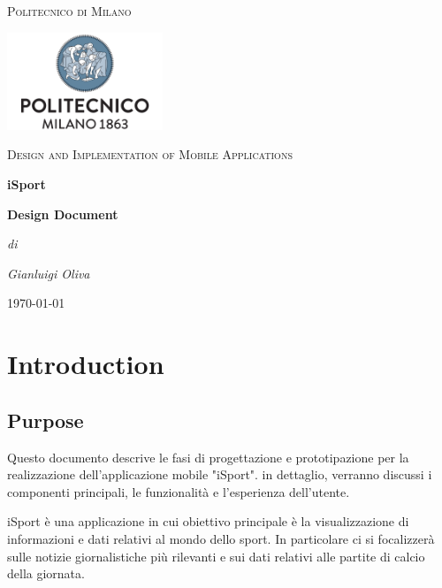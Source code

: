 \documentclass[numbers=noenddot, 12pt, a4paper, oneside]{scrbook}
\begin{document}
\begin{titlepage}
	\centering
	{\scshape\LARGE Politecnico di Milano \par}
	\vspace{1cm}
	\includegraphics[width=0.35\textwidth]{polimi-logo}\par
	\vspace{1cm}

	{\scshape\Large Design and Implementation of Mobile Applications\par}
	\vspace{1.5cm}
	{\huge\bfseries iSport \par}
	\vspace{1cm}
	{\Large\bfseries Design Document \par}
	\vspace{3cm}
	{\Large\itshape di\par}
	{\Large\itshape Gianluigi Oliva\par}
	\vspace{1.5cm}
	\vfill
	


	\vfill

	{\large \today\par}
\end{titlepage}

\newpage
\tableofcontents
\newpage


\chapter{Introduction}

\section{Purpose}
Questo documento descrive le fasi di progettazione e prototipazione per la realizzazione dell'applicazione mobile "iSport". in dettaglio, verranno discussi i componenti principali, le funzionalità e l'esperienza dell'utente.

iSport è una applicazione in cui obiettivo principale è la visualizzazione di informazioni e dati relativi al mondo dello sport. In particolare ci si focalizzerà sulle notizie giornalistiche più rilevanti e sui dati relativi alle partite di calcio della giornata.
\end{document}
